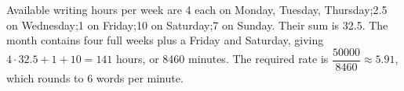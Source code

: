 Available writing hours per week are 4 each on Monday, Tuesday, Thursday;2.5 on Wednesday;1 on Friday;10 on Saturday;7 on Sunday. Their sum is 32.5. The month contains four full weeks plus a Friday and Saturday, giving $4\cdot32.5+1+10=141$ hours, or 8460 minutes. The required rate is $\dfrac{50000}{8460}\approx5.91$, which rounds to $\boxed6$ words per minute.
